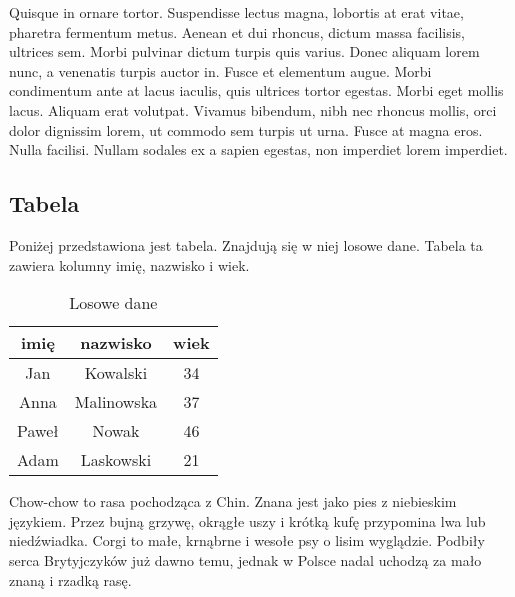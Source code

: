 \documentclass{article}
\begin{document}
Quisque in ornare tortor. Suspendisse lectus magna, lobortis at erat vitae, pharetra fermentum metus. Aenean et dui rhoncus, dictum massa facilisis, ultrices sem. Morbi pulvinar dictum turpis quis varius. Donec aliquam lorem nunc, a venenatis turpis auctor in. Fusce et elementum augue. Morbi condimentum ante at lacus iaculis, quis ultrices tortor egestas. Morbi eget mollis lacus. Aliquam erat volutpat. Vivamus bibendum, nibh nec rhoncus mollis, orci dolor dignissim lorem, ut commodo sem turpis ut urna. Fusce at magna eros. Nulla facilisi. Nullam sodales ex a sapien egestas, non imperdiet lorem imperdiet. 

\newpage
\subsection{Tabela}

Poniżej przedstawiona jest tabela. Znajdują się w niej losowe dane. Tabela ta zawiera kolumny imię, nazwisko i wiek.

\begin{table}[ht]
	\centering
	\begin{tabular}{|c|c|c|}
		\hline
		\textbf{imię} & \textbf{nazwisko} & \textbf{wiek} \\ \hline
		Jan & Kowalski & 34 \\ \hline
		Anna & Malinowska & 37 \\ \hline
		Paweł & Nowak & 46 \\ \hline
		Adam & Laskowski & 21 \\ \hline
	\end{tabular}
	\caption{Losowe dane}
\end{table}

\newpage
\begin{thebibliography}{2}
	Chow-chow to rasa pochodząca z Chin. Znana jest jako pies z niebieskim językiem. Przez bujną grzywę, okrągłe uszy i krótką kufę przypomina lwa lub niedźwiadka.
	Corgi to małe, krnąbrne i wesołe psy o lisim wyglądzie. Podbiły serca Brytyjczyków już dawno temu, jednak w Polsce nadal uchodzą za mało znaną i rzadką rasę.
\end{thebibliography}
\end{document}
